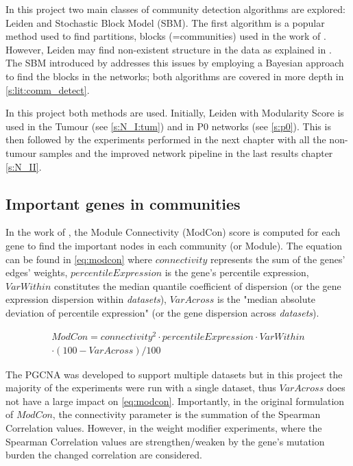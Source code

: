 In this project two main classes of community detection algorithms are explored: Leiden and Stochastic Block Model (SBM). The first algorithm is a popular method used to find partitions, blocks (=communities) used in the work of \citet{Care2019-ij}. However, Leiden may find non-existent structure in the data as explained in \citet{Peixoto2021-jx}. The SBM introduced by \citet{Peixoto2019-fg} addresses this issues by employing a Bayesian approach to find the blocks in the networks; both algorithms are covered in more depth in \cref{s:lit:comm_detect}.

In this project both methods are used. Initially, Leiden with Modularity Score is used in the Tumour (see \cref{s:N_I:tum}) and in P0 networks (see \cref{s:p0}). This is then followed by the experiments performed in the next chapter with all the non-tumour samples and the improved network pipeline in the last results chapter \cref{s:N_II}.

\subsection{Important genes in communities}

In the work of \citet{Care2019-ij}, the  Module Connectivity (ModCon) score is computed for each gene to find the important nodes in each community (or Module). The equation can be found in \cref{eq:modcon} where $connectivity$ represents the sum of the genes' edges' weights, $percentileExpression$ is the gene's percentile expression, $VarWithin$ constitutes the median quantile coefficient of dispersion (or the gene expression dispersion within \textit{datasets}), $VarAcross$ is the "median absolute deviation of percentile expression" (or the gene dispersion across \textit{datasets}).

\begin{multline} \label{eq:modcon}
         ModCon = connectivity^2 \cdot percentileExpression \cdot VarWithin \\
         \cdot (100 - VarAcross) / 100
\end{multline}

The PGCNA was developed to support multiple datasets but in this project the majority of the experiments were run with a single dataset, thus $VarAcross$ does not have a large impact on \cref{eq:modcon}. Importantly, in the original formulation of $ModCon$, the connectivity parameter is the summation of the Spearman Correlation values. However, in the weight modifier experiments, where the Spearman Correlation values are strengthen/weaken by the gene's mutation burden the changed correlation are considered.

